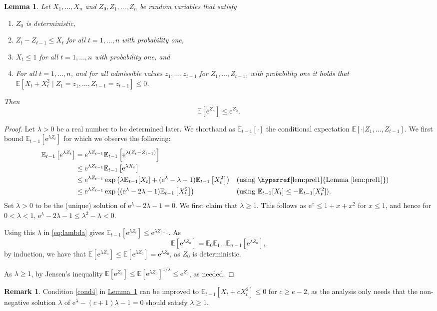 \documentclass[11pt]{article}
\numberwithin{equation}{section}
\newtheorem{lemma}[theorem]{Lemma}
\theoremstyle{definition}
\newtheorem{remark}[theorem]{Remark}
\theoremstyle{plain}
\newcommand{\eee}{\mathrm e}
\newcommand{\expref}[2]{\hyperref[#2]{#1~\ref{#2}}}
\newcommand\E{\mathbb{E}}
\begin{document}
\begin{lemma}
\label{lem:prel2}
Let $X_1,\ldots,X_n$ and $Z_0,Z_1,\ldots,Z_n$ be random variables that satisfy
\begin{enumerate}
\item $Z_0$ is deterministic,
\item $Z_{t}-Z_{t-1}\le X_t$ for all $t=1,\ldots,n$ with probability one,
\item $X_t\leq 1$ for all $t=1,\ldots,n$ with probability one, and
\item \label{cond4} For all $t=1,\ldots,n$, and for all admissible values $z_1,\ldots,z_{t-1}$ for $Z_1,\ldots,Z_{t-1}$,
 with probability one it holds that $\E[X_t+X_t^2\mid Z_1=z_1,\ldots,Z_{t-1}=z_{t-1}] \le 0$.
\end{enumerate}
Then
\[
\E[\eee^{Z_n}] \leq \eee^{ Z_0}.
\]
\end{lemma}
\begin{proof}
Let $\lambda>0$ be a real number to be determined later. We shorthand as $\E_{t-1}[\cdot]$ the conditional expectation $\E[\cdot | Z_1,\dots, Z_{t-1}]$.
We first bound $\E_{t-1}[\eee^{\lambda Z_t}]$ for which we observe the following:
\begin{align}
\E_{t-1}\left[\eee^{\lambda Z_t}\right] &=  \eee^{\lambda Z_{t-1}}\E_{t-1}\left[\eee^{\lambda(Z_t-Z_{t-1})}\right] \nonumber \\
&\le  \eee^{\lambda Z_{t-1}}\E_{t-1}\left[\eee^{\lambda X_t}\right] \nonumber \\
& \le   \eee^{\lambda Z_{t-1}} \exp\left(\lambda \E_{t-1}[X_t] +(\eee^{ \lambda} -\lambda-1 )\E_{t-1}\left[X_t^2\right]\right) && \textrm{(using \expref{Lemma}{lem:prel1})}  \nonumber \\
& \le  \eee^{\lambda Z_{t-1}}\exp\left((\eee^{ \lambda} -2\lambda-1 )\E_{t-1}\left[X_t^2\right]\right) && \textrm{(using }\E_{t-1}[X_t] \le -\E_{t-1}[X_{t}^2] ).
\label{eq:lambda}
\end{align}
Set $\lambda>0$ to be the (unique) solution of $\eee^{ \lambda} -2\lambda-1 =0$.
We first claim that $ \lambda \geq 1$. This follows as  $\eee^x \leq 1 + x + x^2$ for $x \leq 1$, and hence for $0<\lambda<1$,
$\eee^{\lambda} -2\lambda-1 \le\lambda^2 -\lambda <0$.

Using this $\lambda$ in \eqref{eq:lambda} gives
 $\E_{t-1}[\eee^{\lambda Z_t}] \le \eee^{\lambda Z_{t-1}}$.
As
\[ \E[\eee^{\lambda Z_n}] = \E_0 \E_1 \ldots  \E_{n-1} [\eee^{\lambda Z_n}],\]
by induction, we have that $\E[\eee^{\lambda Z_n}] \le \E[\eee^{\lambda Z_0}] = \eee^{\lambda Z_0}$, as
$Z_0$ is deterministic.

As $\lambda \geq 1$, by Jensen's inequality
$\E[\eee^{ Z_n}] \leq \E[\eee^{\lambda Z_n}]^{1/\lambda} \leq \eee^{ Z_0}$,
as needed.
\end{proof}
\begin{remark} Condition \eqref{cond4} in \expref{Lemma}{lem:prel2} can be improved to $\E_{t-1}[X_t + c X_t^2] \leq 0$ for $c \geq e-2$, as the analysis only needs that the non-negative solution $\lambda$ of $\eee^{\lambda} -(c+1) \lambda -1=0$ should satisfy $\lambda \geq 1$.
\end{remark}
\end{document}
